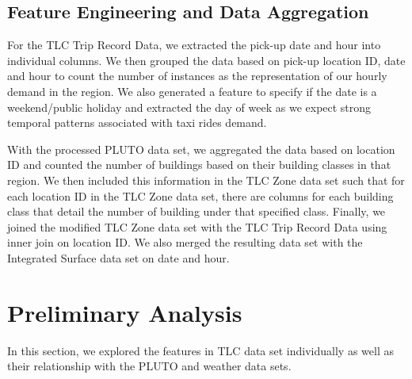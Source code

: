 \documentclass[11pt]{article}
\begin{document}
\subsection{Feature Engineering and Data Aggregation}
For the TLC Trip Record Data, we extracted the pick-up date and hour into individual columns. We then grouped the data based on pick-up location ID, date and hour to count the number of instances as the representation of our hourly demand in the region. We also generated a feature to specify if the date is a weekend/public holiday and extracted the day of week as we expect strong temporal patterns associated with taxi rides demand.

With the processed PLUTO data set, we aggregated the data based on location ID and counted the number of buildings based on their building classes in that region. We then included this information in the TLC Zone data set such that for each location ID in the TLC Zone data set, there are columns for each building class that detail the number of building under that specified class. Finally, we joined the modified TLC Zone data set with the TLC Trip Record Data using inner join on location ID. We also merged the resulting data set with the Integrated Surface data set on date and hour.

\section{Preliminary Analysis}
In this section, we explored the features in TLC data set individually as well as their relationship with the PLUTO and weather data sets. 
\end{document}
